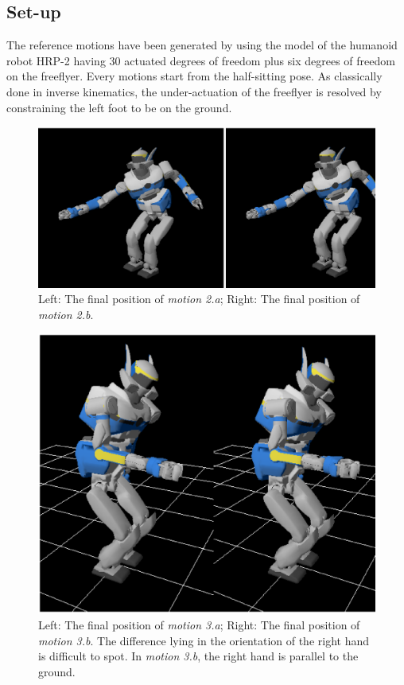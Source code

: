 \documentclass[journal]{IEEEtran}
\begin{document}
\subsection{Set-up}
The reference motions have been generated by using the model of the humanoid robot HRP-2
having 30 actuated degrees of freedom plus six degrees of freedom on the
freeflyer. Every motions start from the half-sitting pose.
As classically done in inverse kinematics, the under-actuation of the freeflyer is resolved by constraining
the left foot to be on the ground.
\begin{figure}[t]
  \begin{center}
    \includegraphics[width=0.6\linewidth]{img/spotDiff.ps}
  \end{center}
  \caption{Left: The final position of \emph{motion 2.a}; Right: The final position of \emph{motion 2.b}.}
  \label{fig:spotDiff1}
\end{figure}
\begin{figure}[t]
\begin{center}
\includegraphics[width=0.40\linewidth]{img/final3.ps}
\end{center}
\caption{Left: The final position of \emph{motion 3.a}; Right: The final position of \emph{motion 3.b}.
The difference lying in the orientation of the right hand is difficult to spot. In \emph{motion 3.b},
the right hand is parallel to the ground.}
\label{fig:spotDiff2}
\vspace{-3pt}
\end{figure}
\end{document}
